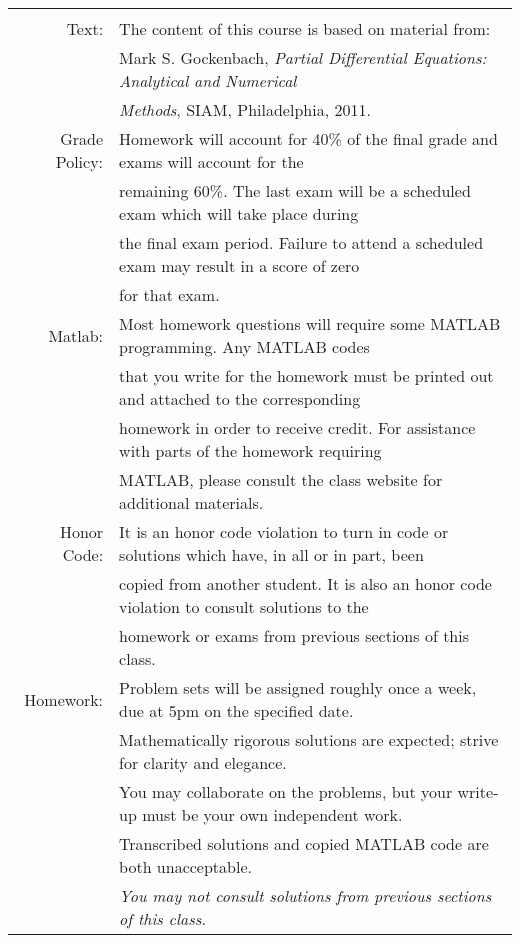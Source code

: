 \documentclass[10pt]{article}
\begin{document}
\hspace*{-3em}
\begin{tabular}{rl}
\hline & \\[-.5em]
%
%
Text: 			& The content of this course is based on material from:\\
				& Mark S. Gockenbach, \emph{Partial Differential Equations: Analytical and Numerical}\\
				& \emph{Methods}, SIAM, Philadelphia, 2011.\\[1.25em]
%
Grade Policy: 		& Homework will account for 40\% of the final grade and exams will account for the \\
				& remaining 60\%.  The last exam will be a scheduled exam which will take place during\\
				& the final exam period. Failure to attend a scheduled exam may result in a score of zero\\
				& for that exam.\\[1.25em]
%
Matlab: 			& Most homework questions will require some MATLAB programming. Any MATLAB codes\\
				& that you write for the homework must be printed out and attached to the corresponding\\
				& homework in order to receive credit. For assistance with parts of the homework requiring \\
				& MATLAB, please consult the class website for additional materials.\\[1.25em] 
%
Honor Code:		& It is an honor code violation to turn in code or solutions which have, in all or in part, been\\
				& copied from another student. It is also an honor code violation to consult solutions to the\\
				& homework or exams from previous sections of this class.\\[1.25em]
%			
Homework: 		& Problem sets will be assigned roughly once a week, due at 5pm on the specified date.\\
				& Mathematically rigorous solutions are expected; strive for clarity and elegance.\\
				& You may collaborate on the problems, but your write-up must be your own independent work.\\
				& Transcribed solutions and copied MATLAB code are both unacceptable.  \\
				& \emph{You may not consult solutions from previous sections of this class.}\\[1.25em] 


\end{tabular}
\end{document}
